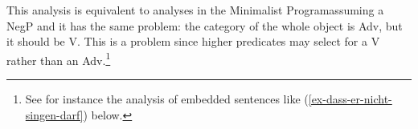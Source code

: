 %
This analysis is equivalent to analyses in the Minimalist Program\indexmp assuming a NegP and it
has the same problem: the category of the whole object is Adv, but it should be V. This is a problem
since higher predicates may select for a V rather than an Adv.\footnote{%
See for instance the analysis of
embedded sentences like (\ref{ex-dass-er-nicht-singen-darf}) below.
}

